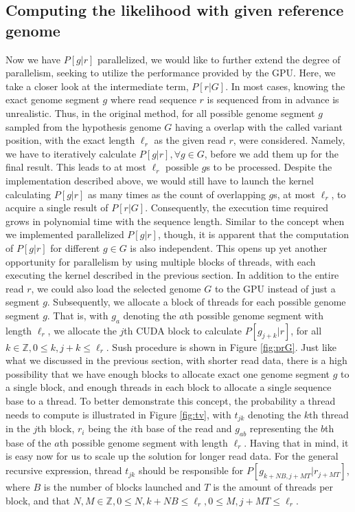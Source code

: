 \documentclass{PHlab-thesis}
\begin{document}
\subsection{Computing the likelihood with given reference genome}
Now we have $P[g|r]$ parallelized, we would like to further extend the degree of parallelism, seeking to utilize the performance provided by the GPU. Here, we take a closer look at the intermediate term, $P[r|G]$. In most cases, knowing the exact genome segment $g$ where read sequence $r$ is sequenced from in advance is unrealistic. Thus, in the original method, for all possible genome segment $g$ sampled from the hypothesis genome $G$ having a overlap with the called variant position, with the exact length ${\ell_r}$ as the given read $r$, were considered. Namely, we have to iteratively calculate $P[g|r], \forall g \in G$, before we add them up for the final result. This leads to at most ${\ell_r}$ possible $g$s to be processed. Despite the implementation described above, we would still have to launch the kernel calculating $P[g|r]$ as many times as the count of overlapping $g$s, at most ${\ell_r}$, to acquire a single result of $P[r|G]$.  Consequently, the execution time required grows in polynomial time with the sequence length. Similar to the concept when we implemented parallelized $P[g|r]$, though, it is apparent that the computation of $P[g|r]$ for different $g \in G$ is also independent. This opens up yet another opportunity for parallelism by using multiple blocks of threads, with each executing the kernel described in the previous section. In addition to the entire read $r$, we could also load the selected genome $G$ to the GPU instead of just a segment $g$. Subsequently, we allocate a block of threads for each possible genome segment $g$. 
That is, with $g_a$ denoting the $a$th possible genome segment with length ${\ell_r}$, we allocate the $j$th CUDA block to calculate $P[g_{j+k}|r]$, for all $k \in \mathbb{Z} ,0 \leq k, j+k \leq {\ell_r}$. Sush procedure is shown in Figure \ref{fig:prG}. Just like what we discussed in the previous section, with shorter read data, there is a high possibility that we have enough blocks to allocate exact one genome segment $g$ to a single block, and enough threads in each block to allocate a single sequence base to a thread. To better demonstrate this concept, the probability a thread needs to compute is illustrated in Figure \ref{fig:tv}, with $t_{jk}$ denoting the $k$th thread in the $j$th block, $r_i$ being the $i$th base of the read and $g_{ab}$ representing the $b$th base of the $a$th possible genome segment with length ${\ell_r}$. Having that in mind, it is easy now for us to scale up the solution for longer read data. For the general recursive expression, thread $t_{jk}$ should be responsible for $P[g_{k+NB,j+MT}|r_{j+MT}]$, where $B$ is the number of blocks launched and $T$ is the amount of threads per block, and that $N, M \in \mathbb{Z} ,0 \leq N, k+NB \leq {\ell_r}, 0 \leq M, j+MT \leq {\ell_r}$.
\end{document}
